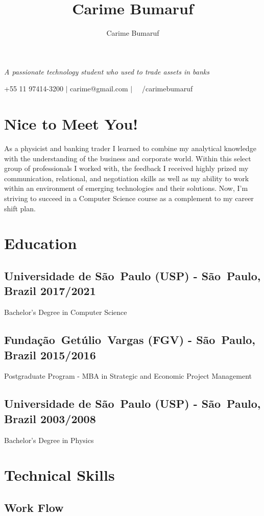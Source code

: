 \documentclass{article}
\makeatletter
\renewcommand{\maketitle}{
    \begin{raggedleft}
    {\Huge\bfseries\theauthor}

    \vspace{.25em}
    \large{\emph{A passionate technology student who used to trade assets in banks}}\

    \vspace{.25em}
    +55 11 97414-3200 $|$ carime@gmail.com $|$  \faLinkedin\  \ /carimebumaruf

    \end{raggedleft}
}
\makeatother
\begin{document}
\title{Carime Bumaruf}
\author{Carime Bumaruf}

\maketitle

\vspace{2.5mm} %

\section{Nice to Meet You!}
As a physicist and banking trader I learned to combine my analytical knowledge with the understanding of the business
and corporate world. Within this select group of professionals I worked with, the feedback I received highly prized my
communication, relational, and negotiation skills as well as my ability to work within an environment of emerging
technologies and their solutions. Now, I'm striving to succeed in a Computer Science course as a complement to my
career shift plan.
 
\section{Education}
\subsection{Universidade de S\~ao\ Paulo (USP) - S\~ao\ Paulo, Brazil \hfill 2017/2021}
Bachelor's Degree in Computer Science

\subsection{Funda\c{c}\~ao\ Get\'ulio\ Vargas (FGV) - S\~ao\ Paulo, Brazil \hfill 2015/2016}
Postgraduate Program - MBA in Strategic and Economic Project Management

\subsection{Universidade de S\~ao\ Paulo (USP) - S\~ao\ Paulo, Brazil \hfill 2003/2008}
Bachelor's Degree in Physics

\section{Technical Skills}
\subsection[]{Work Flow}
\end{document}
